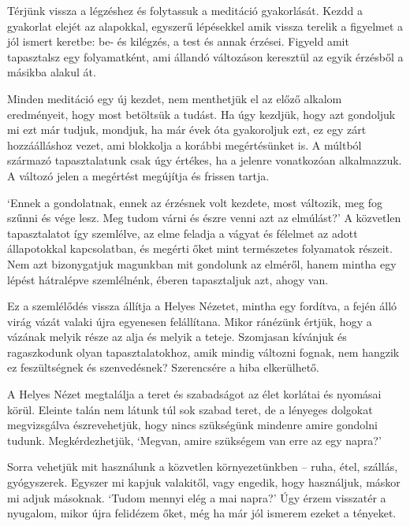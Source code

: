 
\noindent Térjünk vissza a légzéshez és folytassuk a meditáció
gyakorlását. Kezdd a gyakorlat elejét az alapokkal, egyszerű lépésekkel
amik vissza terelik a figyelmet a jól ismert keretbe: be- és kilégzés, a
test és annak érzései. Figyeld amit tapasztalsz egy folyamatként, ami
állandó változáson keresztül az egyik érzésből a másikba alakul át.

Minden meditáció egy új kezdet, nem menthetjük el az előző alkalom
eredményeit, hogy most betöltsük a tudást. Ha úgy kezdjük, hogy azt
gondoljuk mi ezt már tudjuk, mondjuk, ha már évek óta gyakoroljuk ezt,
ez egy zárt hozzáálláshoz vezet, ami blokkolja a korábbi megértésünket
is. A múltból származó tapasztalatunk csak úgy értékes, ha a jelenre
vonatkozóan alkalmazzuk. A változó jelen a megértést megújítja és
frissen tartja.

`Ennek a gondolatnak, ennek az érzésnek volt kezdete, most változik, meg
fog szűnni és vége lesz. Meg tudom várni és észre venni azt az
elmúlást?' A közvetlen tapasztalatot így szemlélve, az elme feladja a
vágyat és félelmet az adott állapotokkal kapcsolatban, és megérti őket
mint természetes folyamatok részeit. Nem azt bizonygatjuk magunkban mit
gondolunk az elméről, hanem mintha egy lépést hátralépve szemlélnénk,
éberen tapasztaljuk azt, ahogy van.

Ez a szemlélődés vissza állítja a Helyes Nézetet, mintha egy fordítva, a
fején álló virág vázát valaki újra egyenesen felállítana. Mikor ránézünk
értjük, hogy a vázának melyik része az alja és melyik a teteje.
Szomjasan kívánjuk és ragaszkodunk olyan tapasztalatokhoz, amik mindig
változni fognak, nem hangzik ez feszültségnek és szenvedésnek?
Szerencsére a hiba elkerülhető.


A Helyes Nézet megtalálja a teret és szabadságot az élet korlátai és
nyomásai körül. Eleinte talán nem látunk túl sok szabad teret, de a
lényeges dolgokat megvizsgálva észrevehetjük, hogy nincs szükségünk
mindenre amire gondolni tudunk. Megkérdezhetjük, `Megvan, amire
szükségem van erre az egy napra?'

Sorra vehetjük mit használunk a közvetlen környezetünkben -- ruha, étel,
szállás, gyógyszerek. Egyszer mi kapjuk valakitől, vagy engedik, hogy
használjuk, máskor mi adjuk másoknak. `Tudom mennyi elég a mai napra?'
Úgy érzem visszatér a nyugalom, mikor újra felidézem őket, még ha már
jól ismerem ezeket a tényeket.

